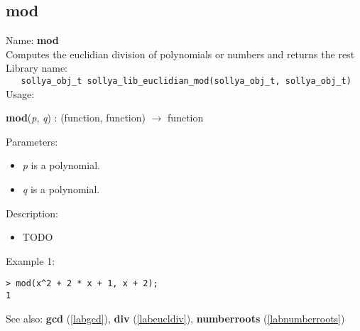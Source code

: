 \subsection{mod}
\label{labeuclmod}
\noindent Name: \textbf{mod}\\
\phantom{aaa}Computes the euclidian division of polynomials or numbers and returns the rest\\[0.2cm]
\noindent Library name:\\
\verb|   sollya_obj_t sollya_lib_euclidian_mod(sollya_obj_t, sollya_obj_t)|\\[0.2cm]
\noindent Usage: 
\begin{center}
\textbf{mod}(\emph{p}, \emph{q}) : (\textsf{function}, \textsf{function}) $\rightarrow$ \textsf{function}\\
\end{center}
Parameters: 
\begin{itemize}
\item \emph{p} is a polynomial.
\item \emph{q} is a polynomial.
\end{itemize}
\noindent Description: \begin{itemize}

\item TODO
\end{itemize}
\noindent Example 1: 
\begin{center}\begin{minipage}{15cm}\begin{Verbatim}[frame=single]
> mod(x^2 + 2 * x + 1, x + 2);
1
\end{Verbatim}
\end{minipage}\end{center}
See also: \textbf{gcd} (\ref{labgcd}), \textbf{div} (\ref{labeucldiv}), \textbf{numberroots} (\ref{labnumberroots})
